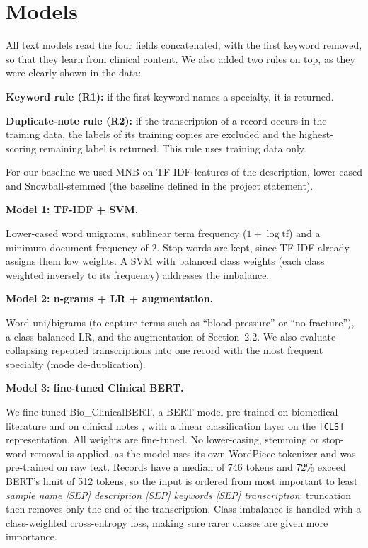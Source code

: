 \documentclass[twocolumn,10pt]{article}
\begin{document}
\section{Models}

\noindent All text models read the four fields concatenated, with the first keyword removed, so that they learn from clinical content. We also added two rules on top, as they were clearly shown in the data:

\noindent\textbf{Keyword rule (R1):} if the first keyword names a specialty, it is returned.

\noindent\textbf{Duplicate-note rule (R2):} if the transcription of a record occurs in the training data, the labels of its training copies are excluded and the highest-scoring remaining label is returned. This rule uses training data only.
\hfill \break

\noindent For our baseline we used \ac{MNB} on \ac{TF-IDF} features of the description, lower-cased and Snowball-stemmed (the baseline defined in the project statement).

\noindent\textbf{Model 1: \ac{TF-IDF} + \ac{SVM}.}

\noindent Lower-cased word unigrams, sublinear term frequency ($1+\log \mathrm{tf}$) and a minimum document frequency of 2. Stop words are kept, since \ac{TF-IDF} already assigns them low weights. A \ac{SVM} with balanced class weights (each class weighted inversely to its frequency) addresses the imbalance.
\hfill \break

\noindent\textbf{Model 2: n-grams + \ac{LR} + augmentation.}

\noindent Word uni/bigrams (to capture terms such as ``blood pressure'' or ``no fracture''), a class-balanced \ac{LR}, and the augmentation of Section~2.2. We also evaluate collapsing repeated transcriptions into one record with the most frequent specialty (mode de-duplication).
\hfill \break

\noindent\textbf{Model 3: fine-tuned Clinical BERT.}

\noindent We fine-tuned Bio\_ClinicalBERT, a BERT model \cite{devlin2019} pre-trained on biomedical literature and on clinical notes \cite{alsentzer2019}, with a linear classification layer on the \texttt{[CLS]} representation. All weights are fine-tuned. No lower-casing, stemming or stop-word removal is applied, as the model uses its own WordPiece tokenizer and was pre-trained on raw text. Records have a median of 746 tokens and 72\% exceed BERT's limit of 512 tokens, so the input is ordered from most important to least \emph{sample name [SEP] description [SEP] keywords [SEP] transcription}: truncation then removes only the end of the transcription. Class imbalance is handled with a class-weighted cross-entropy loss, making sure rarer classes are given more importance.
\hfill \break
\end{document}
